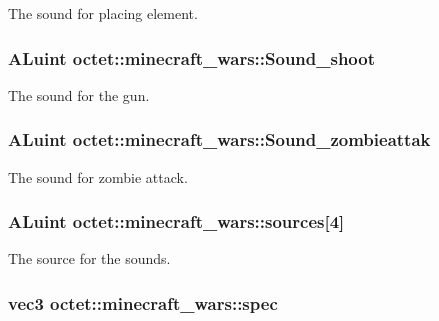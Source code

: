 The sound for placing element. 

\hypertarget{classoctet_1_1minecraft__wars_a8a76b75425f33dfe9a3895d5c1557e82}{
\subsubsection[{Sound\+\_\+shoot}]{\setlength{\rightskip}{0pt plus 5cm}A\+Luint octet\+::minecraft\+\_\+wars\+::\+Sound\+\_\+shoot\hspace{0.3cm}{\ttfamily [private]}}}\label{classoctet_1_1minecraft__wars_a8a76b75425f33dfe9a3895d5c1557e82}


The sound for the gun. 

\hypertarget{classoctet_1_1minecraft__wars_ab065d64bf9df1a96bfd62b964b0c249e}{
\subsubsection[{Sound\+\_\+zombieattak}]{\setlength{\rightskip}{0pt plus 5cm}A\+Luint octet\+::minecraft\+\_\+wars\+::\+Sound\+\_\+zombieattak\hspace{0.3cm}{\ttfamily [private]}}}\label{classoctet_1_1minecraft__wars_ab065d64bf9df1a96bfd62b964b0c249e}


The sound for zombie attack. 

\hypertarget{classoctet_1_1minecraft__wars_a2ee223674fa2fbe1616629725a6d845e}{
\subsubsection[{sources}]{\setlength{\rightskip}{0pt plus 5cm}A\+Luint octet\+::minecraft\+\_\+wars\+::sources\mbox{[}4\mbox{]}\hspace{0.3cm}{\ttfamily [private]}}}\label{classoctet_1_1minecraft__wars_a2ee223674fa2fbe1616629725a6d845e}


The source for the sounds. 

\hypertarget{classoctet_1_1minecraft__wars_ab87766352cd67053cc6321ee3b50f0bd}{
\subsubsection[{spec}]{\setlength{\rightskip}{0pt plus 5cm}vec3 octet\+::minecraft\+\_\+wars\+::spec\hspace{0.3cm}{\ttfamily [private]}}}\label{classoctet_1_1minecraft__wars_ab87766352cd67053cc6321ee3b50f0bd}


